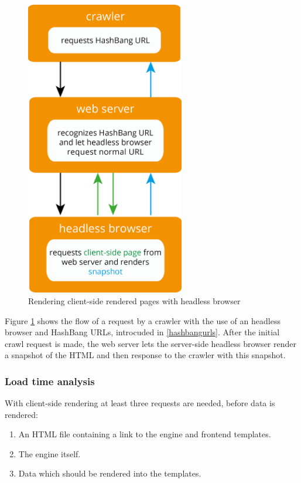 \begin{figure}[H]
\centering
\includegraphics[height=13cm]{images/frontend_snapshots.png}
\caption[frontend_snapshots]{Rendering client-side rendered pages with headless browser}
\label{fig:frontend_snapshots}
\end{figure}

\noindent{}Figure \ref{fig:frontend_snapshots} shows the flow of a request by a crawler with the use of an headless browser and HashBang URLs, introcuded in \ref{hashbangurls}.
After the initial crawl request is made, the web server lets the server-side headless browser render a snapshot of the HTML and then response to the crawler with this snapshot.

\subsubsection{Load time analysis}
With client-side rendering at least three requests are needed, before data is rendered:
\begin{enumerate}
    \item An HTML file containing a link to the \ajax{} engine and frontend templates.
    \item The \ajax{} engine itself.
    \item Data which should be rendered into the templates.
\end{enumerate}

